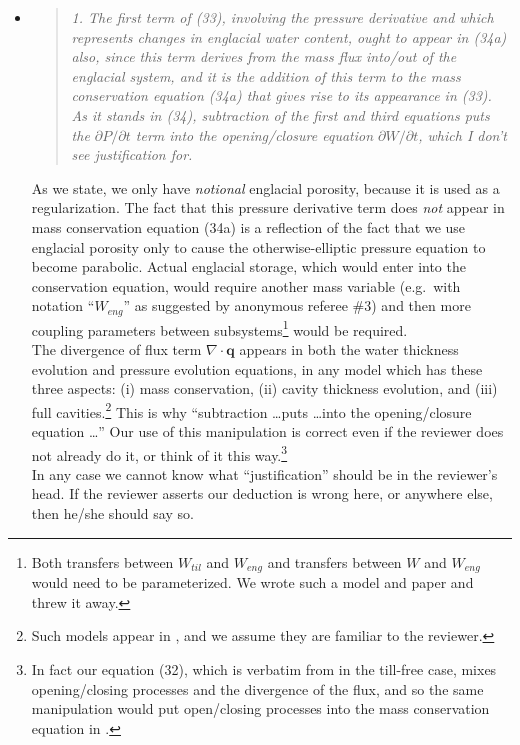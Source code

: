 \documentclass[11pt,reqno]{amsart}
\newcommand{\Div}{\ensuremath{\nabla\cdot}}
\newcommand{\reply}[2]{
\medskip\medskip
\item  \begin{quote}
\emph{#1}
\end{quote}

\medskip
\noindent #2}
\begin{document}
\begin{itemize}
\reply{1. The first term of (33), involving the pressure derivative and which represents
changes in englacial water content, ought to appear in (34a) also, since this term
derives from the mass flux into/out of the englacial system, and it is the addition
of this term to the mass conservation equation (34a) that gives rise to its appearance in (33).  As it stands in (34), subtraction of the first and third equations
puts the $\partial P/\partial t$ term into the opening/closure equation $\partial W/\partial t$, which I don't see justification for.}
{As we state, we only have \emph{notional} englacial porosity, because it is used as a regularization.  The fact that this pressure derivative term does \emph{not} appear in mass conservation equation (34a) is a reflection of the fact that we use englacial porosity only to cause the otherwise-elliptic pressure equation to become parabolic.  Actual englacial storage, which would enter into the conservation equation, would require another mass variable (e.g.~with notation ``$W_{eng}$'' as suggested by anonymous referee \#3) and then more coupling parameters between subsystems\footnote{Both transfers between $W_{til}$ and $W_{eng}$ and transfers between $W$ and $W_{eng}$ would need to be parameterized.  We wrote such a model and paper and threw it away.} would be required. \\
\indent The divergence of flux term $\Div\mathbf{q}$ appears in both the water thickness evolution and pressure evolution equations, in any model which has these three aspects: (i) mass conservation, (ii) cavity thickness evolution, and (iii) full cavities.\footnote{Such models appear in \cite{Hewitt2011,Hewittetal2012,Schoofetal2012,Werderetal2013}, and we assume they are familiar to the reviewer.}  This is why ``subtraction \dots puts \dots into the opening/closure equation \dots''  Our use of this manipulation is correct even if the reviewer does not already do it, or think of it this way.\footnote{In fact our equation (32), which is verbatim from \cite{Schoofetal2012} in the till-free case, mixes opening/closing processes and the divergence of the flux, and so the same manipulation would put open/closing processes into the mass conservation equation in \cite{Schoofetal2012}.} \\
\indent In any case we cannot know what ``justification'' should be in the reviewer's head.  If the reviewer asserts our deduction is wrong here, or anywhere else, then he/she should say so.}


\end{itemize}
\end{document}

